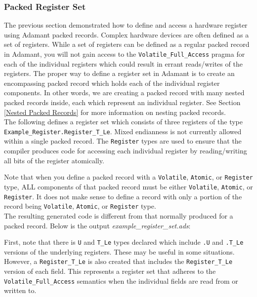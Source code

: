 \subsubsection{Packed Register Set}

The previous section demonstrated how to define and access a hardware register using Adamant packed records. Complex hardware devices are often defined as a set of registers. While a set of registers can be defined as a regular packed record in Adamant, you will not gain access to the \texttt{Volatile\_Full\_Access} pragma for each of the individual registers which could result in errant reads/writes of the registers. The proper way to define a register set in Adamant is to create an encompassing packed record which holds each of the individual register components. In other words, we are creating a packed record with many nested packed records inside, each which represent an individual register. See Section \ref{Nested Packed Records} for more information on nesting packed records. \\

The following defines a register set which consists of three registers of the type \texttt{Example\_Register.Register\_T\_Le}. Mixed endianness is not currently allowed within a single packed record. The \texttt{Register} types are used to ensure that the compiler produces code for accessing each individual register by reading/writing all bits of the register atomically.


Note that when you define a packed record with a \texttt{Volatile}, \texttt{Atomic}, or \texttt{Register} type, ALL components of that packed record must be either \texttt{Volatile}, \texttt{Atomic}, or \texttt{Register}. It does not make sense to define a record with only a portion of the record being \texttt{Volatile}, \texttt{Atomic}, or \texttt{Register} type. \\

The resulting generated code is different from that normally produced for a packed record. Below is the output \textit{example\_register\_set.ads}:


First, note that there is \texttt{U} and \texttt{T\_Le} types declared which include \texttt{.U} and \texttt{.T\_Le} versions of the underlying registers. These may be useful in some situations. However, a \texttt{Register\_T\_Le} is also created that includes the \texttt{Register\_T\_Le} version of each field. This represents a register set that adheres to the \texttt{Volatile\_Full\_Access} semantics when the individual fields are read from or written to. \\

